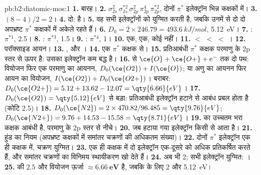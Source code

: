 \begin{solution}{pb:b2:diatomic-mos:1}
\textbf{1.} बारह।
\textbf{2.} $\sigma_{2s}^2\,\sigma_{2s}^{*2}\,\sigma_{2p}^2\,\pi_{2p}^4\,\pi_{2p}^{*2}$, दोनों $\pi^*$
इलेक्ट्रॉन भिन्न कक्षकों में।
\textbf{3.} $(8 - 4)/2 = 2$।
\textbf{4.} दो:   है।
\textbf{5.} वह सभी इलेक्ट्रॉनों को युग्मित करती है, जबकि उनमें से दो दो अपभ्रष्ट
$\pi^*$ कक्षकों में अकेले रहते हैं।
\textbf{6.} $D_0 = 2 \times 246.79 = \qty{493.6}{kJ/mol}$, \qty{5.12}{eV}।
\textbf{7.} : $\pi^{*1}$,  2.5।
\textbf{8.} : $\pi^{*3}$,  1.5।
\textbf{9.} : $\pi^{*4}$,  1।
\textbf{10.}  एक,  एक,  कोई नहीं।
\textbf{11.}  $<$  $<$  $<$ ।
\textbf{12.} परॉक्साइड आयन।
\textbf{13.} ,  और ।
\textbf{14.} एक $\pi^*$ कक्षक से।
\textbf{15.} प्रतिआबंधी $\pi^*$ कक्षक परमाणु के 2p स्तर से ऊपर है: उसका
इलेक्ट्रॉन कम बद्ध है।
\textbf{16.}  से $\ce{O} + \ce{O+} + \mathrm e^-$ तक दो पथ: वियोजन फिर
एक परमाणु का आयनन, $D_0(\ce{O2}) + I(\ce{O})$; या अणु का आयनन फिर आयन का वियोजन,
$I(\ce{O2}) + D_0(\ce{O2+})$। बराबर: $D_0(\ce{O2+}) = 5.12 + 13.62 - 12.07 = \qty{6.66}{eV}$।
\textbf{17.} $D_0(\ce{O2}) = \qty{5.12}{eV}$ से बड़ा: प्रतिआबंधी इलेक्ट्रॉन हटाने से
आबंध प्रबल होता है (कोटि 2.5)।
\textbf{18.} $D_0(\ce{N2}) = 2 \times 470.82/96.485 = \qty{9.76}{eV}$; $D_0(\ce{N2+}) = 9.76 +
14.53 - 15.58 = \qty{8.71}{eV}$।
\textbf{19.}  का उच्चतम भरा कक्षक आबंधी है, परमाणु के 2p स्तर से
नीचे।
\textbf{20.} जब हटाया गया इलेक्ट्रॉन किसी  से आता है।
\textbf{21.} हुंड का नियम (अपभ्रष्ट कक्षकों में समांतर चक्रणों की अधिकतम संख्या)।
\textbf{22.} दोनों $\pi^*$ इलेक्ट्रॉन एक ही कक्षक में, चक्रण युग्मित।
\textbf{23.} एक ही कक्षक में दो इलेक्ट्रॉन एक-दूसरे को अधिक प्रतिकर्षित करते हैं, और समांतर
चक्रणों का विनिमय स्थायीकरण खो देते हैं।
\textbf{24.}  अब भी 2; सभी इलेक्ट्रॉन युग्मित: ।
\textbf{25.}  की  $\boldsymbol{2.5}$ और वियोजन ऊर्जा
$\boldsymbol{\approx \qty{6.66}{eV}}$ है, जबकि  के लिए 2 और \qty{5.12}{eV}।
\end{solution}
